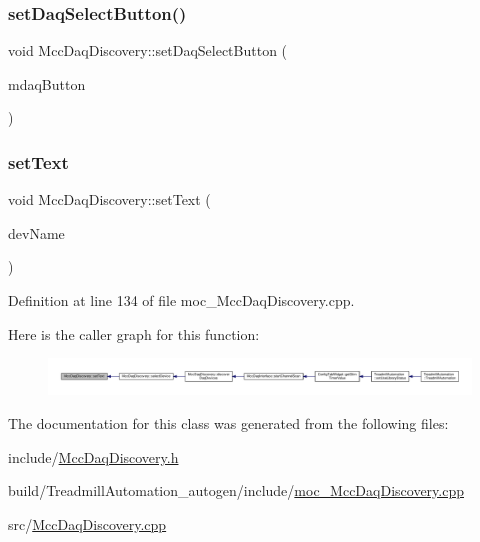\subsubsection{\texorpdfstring{set\+Daq\+Select\+Button()}{setDaqSelectButton()}}
{\footnotesize\ttfamily void Mcc\+Daq\+Discovery\+::set\+Daq\+Select\+Button (\begin{DoxyParamCaption}\item[{Q\+Push\+Button $\ast$}]{mdaq\+Button }\end{DoxyParamCaption})}

\mbox{\label{class_mcc_daq_discovery_a5e82ed7ce9292c4f2b7cdc13dd09eb9c}} 
\subsubsection{\texorpdfstring{set\+Text}{setText}}
{\footnotesize\ttfamily void Mcc\+Daq\+Discovery\+::set\+Text (\begin{DoxyParamCaption}\item[{Q\+String}]{dev\+Name }\end{DoxyParamCaption})\hspace{0.3cm}{\ttfamily [signal]}}



Definition at line 134 of file moc\+\_\+\+Mcc\+Daq\+Discovery.\+cpp.

Here is the caller graph for this function\+:
\nopagebreak
\begin{figure}[H]
\begin{center}
\leavevmode
\includegraphics[width=350pt]{class_mcc_daq_discovery_a5e82ed7ce9292c4f2b7cdc13dd09eb9c_icgraph}
\end{center}
\end{figure}


The documentation for this class was generated from the following files\+:\begin{DoxyCompactItemize}
\item 
include/\hyperlink{_mcc_daq_discovery_8h}{Mcc\+Daq\+Discovery.\+h}\item 
build/\+Treadmill\+Automation\+\_\+autogen/include/\hyperlink{moc___mcc_daq_discovery_8cpp}{moc\+\_\+\+Mcc\+Daq\+Discovery.\+cpp}\item 
src/\hyperlink{_mcc_daq_discovery_8cpp}{Mcc\+Daq\+Discovery.\+cpp}\end{DoxyCompactItemize}
